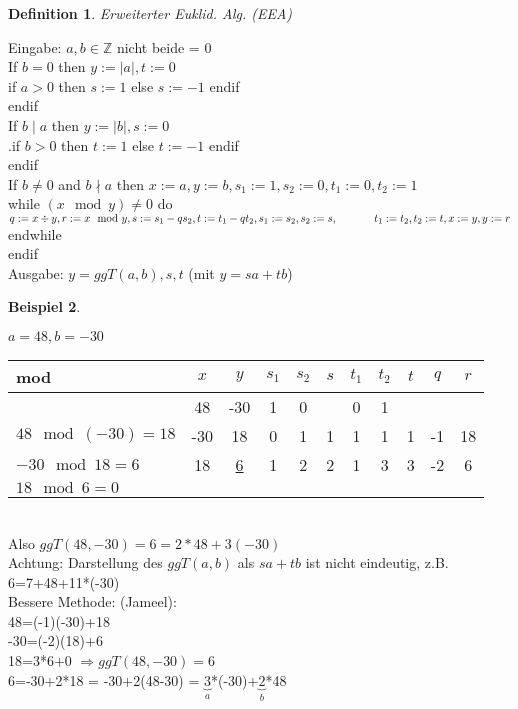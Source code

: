 \documentclass[a4paper,11pt]{article}
\newtheorem{definition}{Definition}[section]
\newtheorem{bsp}[definition]{Beispiel}
\newcommand{\hsp}{\hspace{5mm}}
\begin{document}
\begin{definition}
	Erweiterter Euklid. Alg. (EEA)
\end{definition}
Eingabe: $a,b\in\mathbb{Z}$ nicht beide = 0 \\
If $b=0$ then $y:=\vert a\vert, t:=0$ \\
\phantom{x}\hsp if $a>0$ then $s:=1$ else $s:=-1$ endif \\
endif \\
If $b\mid a$ then $y:=\vert b\vert, s:=0$ \\
.\hsp if $b>0$ then $t:=1$ else $t:=-1$ endif \\
endif \\
If $b\neq0$ and $b\nmid a$ then $x:=a,y:=b,s_1:=1,s_2:=0,t_1:=0,t_2:=1$ \\
\phantom{x}\hsp while $(x\mod y)\neq0$ do \\
\phantom{x}\hsp\hsp $q:=x\div y, r:=x\mod y,s:=s_1-qs_2,t:=t_1-qt_2,s_1:=s_2,s_2:=s, \\
\phantom{x}\hsp\hsp t_1:=t_2,t_2:=t,x:=y,y:=r$  \\
\phantom{x}\hsp endwhile \\
endif \\
Ausgabe: $y=ggT(a,b),s,t$ (mit $y=sa+tb$)

\newpage

\begin{bsp}
\end{bsp}
$a=48,b=-30$ \\
\begin{tabular}{l|c|c|c|c|c|c|c|c|c|c}
mod & $x$ & $y$ & $s_1$ & $s_2$ & $s$ & $t_1$ & $t_2$ & $t$ & $q$ & $r$ \\
\hline
&48 & -30 & 1 & 0 & & 0 & 1&& \\
$48\mod(-30)=18$ & -30 & 18 & 0 & 1 & 1 & 1 & 1 & 1 & -1 & 18 \\
$-30\mod18=6$ & 18 & \underline{6} & 1 & 2 & 2 & 1 & 3 & 3 & -2 & 6 \\
$18\mod6=0$ 
\end{tabular} \\
Also $ggT(48,-30)=6=2*48+3(-30)$ \\
Achtung: Darstellung des $ggT(a,b)$ als $sa+tb$ ist nicht eindeutig, z.B. 6=7+48+11*(-30)
\vspace{5mm} \\
Bessere Methode: (Jameel): \\
48=(-1)(-30)+18 \\
-30=(-2)(18)+6 \\
18=3*6+0 $\Rightarrow ggT(48,-30)=6$ \\
6=-30+2*18 = -30+2(48-30) = $\underbrace{3}_{a}$*(-30)+$\underbrace{2}_{b}$*48
\end{document}
